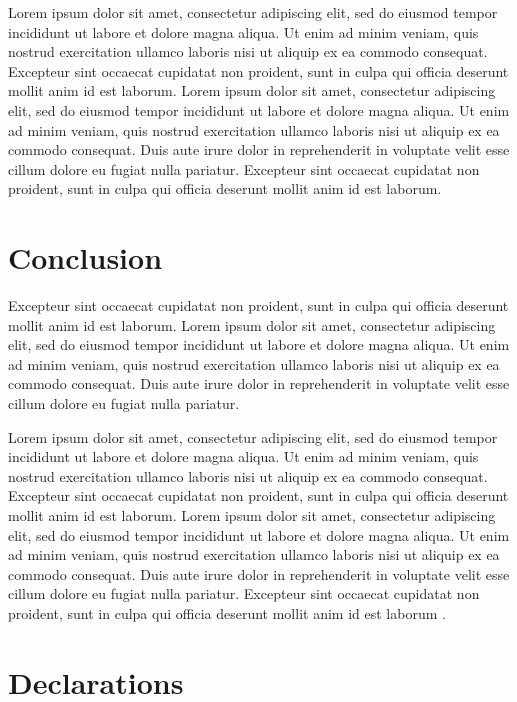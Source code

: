 \documentclass{sbc2023}%
\begin{document}
Lorem ipsum dolor sit amet, consectetur adipiscing elit, sed do eiusmod tempor incididunt ut labore et dolore magna aliqua. Ut enim ad minim veniam, quis nostrud exercitation ullamco laboris nisi ut aliquip ex ea commodo consequat. Excepteur sint occaecat cupidatat non proident, sunt in culpa qui officia deserunt mollit anim id est laborum. Lorem ipsum dolor sit amet, consectetur adipiscing elit, sed do eiusmod tempor incididunt ut labore et dolore magna aliqua. Ut enim ad minim veniam, quis nostrud exercitation ullamco laboris nisi ut aliquip ex ea commodo consequat. Duis aute irure dolor in reprehenderit in voluptate velit esse cillum dolore eu fugiat nulla pariatur. Excepteur sint occaecat cupidatat non proident, sunt in culpa qui officia deserunt mollit anim id est laborum.

\section{Conclusion}

Excepteur sint occaecat cupidatat non proident, sunt in culpa qui officia deserunt mollit anim id est laborum. Lorem ipsum dolor sit amet, consectetur adipiscing elit, sed do eiusmod tempor incididunt ut labore et dolore magna aliqua. Ut enim ad minim veniam, quis nostrud exercitation ullamco laboris nisi ut aliquip ex ea commodo consequat. Duis aute irure dolor in reprehenderit in voluptate velit esse cillum dolore eu fugiat nulla pariatur. 

Lorem ipsum dolor sit amet, consectetur adipiscing elit, sed do eiusmod tempor incididunt ut labore et dolore magna aliqua. Ut enim ad minim veniam, quis nostrud exercitation ullamco laboris nisi ut aliquip ex ea commodo consequat. Excepteur sint occaecat cupidatat non proident, sunt in culpa qui officia deserunt mollit anim id est laborum. Lorem ipsum dolor sit amet, consectetur adipiscing elit, sed do eiusmod tempor incididunt ut labore et dolore magna aliqua. Ut enim ad minim veniam, quis nostrud exercitation ullamco laboris nisi ut aliquip ex ea commodo consequat. Duis aute irure dolor in reprehenderit in voluptate velit esse cillum dolore eu fugiat nulla pariatur. Excepteur sint occaecat cupidatat non proident, sunt in culpa qui officia deserunt mollit anim id est laborum \citep{ref5}.


\section*{Declarations}
\end{document}
